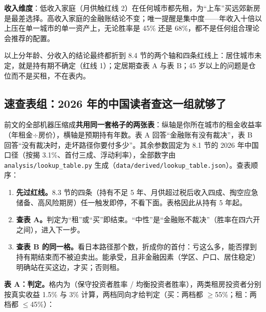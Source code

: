 \documentclass[11pt,a4paper]{ctexart}
\begin{document}
\textbf{收入维度}：低收入家庭（月供触红线 2）在任何城市都先租，为``上车''买远郊新房是最差选择。高收入家庭的金融账结论不变；唯一提醒是集中度——年收入十倍以上压在单一城市的单一资产上，无论胜率是 45\% 还是 68\%，都不是任何组合理论会推荐的配置。

以上分年龄、分收入的结论最终都折到 8.4 节的两个轴和四条红线上：居住城市未定，就是持有期不确定（红线 1）；定居期查表 A 与表 B；45 岁以上的问题是仓位而不是买租，不在表内。

\subsection{速查表组：2026 年的中国读者查这一组就够了}

前文的全部机器压缩成\textbf{共用同一套格子的两张表}：纵轴是你所在城市的租金收益率（年租金$\div$房价），横轴是预期持有年数。表 A 回答``金融账有没有裁决''，表 B 回答``没有裁决时，走坏路径你要付多少''。其余参数固定为 8.1 节的 2026 年中国口径（按揭 3.1\%、首付三成、浮动利率），全部数字由 \texttt{analysis/lookup\_table.py} 生成（\texttt{data/derived/lookup\_table.json}）。查表顺序：

\begin{enumerate}\itemsep0.2em
\setcounter{enumi}{-1}
\item \textbf{先过红线。}8.3 节的四条（持有不足 5 年、月供超过税后收入四成、掏空应急储备、高风险期房）任一触发即停，不看下面。表格因此从持有 5 年起。
\item \textbf{查表 A。}判定为``租''或``买''即结束。``中性''是``金融账不裁决''（胜率在四六开之间），进入下一步。
\item \textbf{查表 B 的同一格。}看日本路径那个数，折成你的首付：亏这么多，能否撑到持有期结束而不被迫卖出。能承受，且非金融因素（学区、户口、居住稳定）明确站在买这边，才买；否则租。
\end{enumerate}

\textbf{表 A：判定。}格内为（保守投资者胜率 / 均衡投资者胜率），两类租房投资者分别按真实收益 1.5\% 与 3\% 计算，两档同向才给判定（买：两档都 $\geq$55\%；租：两档都 $\leq$45\%）：
\end{document}
